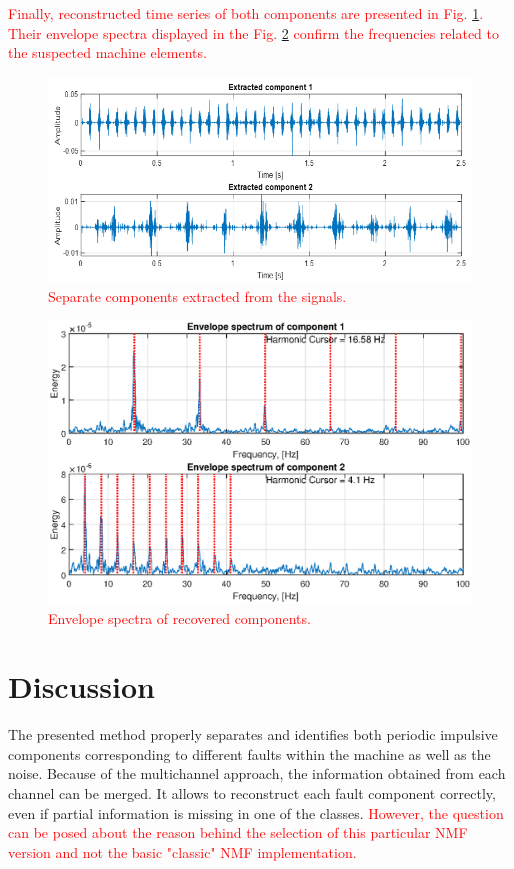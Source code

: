 \documentclass[3p,12pt]{elsarticle}
\begin{document}
\textcolor{red}{Finally, reconstructed time series of both components are presented in Fig. \ref{fig:NMF_out2}. Their envelope spectra displayed in the Fig. \ref{fig:NMF_env2} confirm the frequencies related to the suspected machine elements.}

\begin{figure}[ht!]
\centering
\includegraphics[width=\textwidth]{figs/res2.png}
\caption{\textcolor{red}{Separate components extracted from the signals.}}
\label{fig:NMF_out2}
\end{figure}

\begin{figure}[ht!]
\centering
\includegraphics[width=\textwidth]{figs/env2.eps}
\caption{\textcolor{red}{Envelope spectra of recovered components.}}
\label{fig:NMF_env2}
\end{figure}

\section{Discussion}\label{disc}
The presented method properly separates and identifies both periodic impulsive components corresponding to different faults within the machine as well as the noise. Because of the multichannel approach, the information obtained from each channel can be merged. It allows to reconstruct each fault component correctly, even if partial information is missing in one of the classes. \textcolor{red}{However, the question can be posed about the reason behind the selection of this particular NMF version and not the basic "classic" NMF implementation.}
\end{document}
